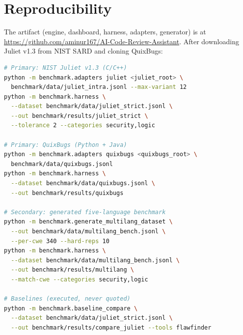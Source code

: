 \documentclass[10pt,conference]{IEEEtran}
\begin{document}
\section*{Reproducibility}
The artifact (engine, dashboard, harness, adapters, generator) is at
\url{https://github.com/aminur167/AI-Code-Review-Assistant}. After
downloading Juliet v1.3 from NIST SARD and cloning QuixBugs:
\begin{lstlisting}[language=bash,numbers=none]
# Primary: NIST Juliet v1.3 (C/C++)
python -m benchmark.adapters juliet <juliet_root> \
  benchmark/data/juliet_intra.jsonl --max-variant 12
python -m benchmark.harness \
  --dataset benchmark/data/juliet_strict.jsonl \
  --out benchmark/results/juliet_strict \
  --tolerance 2 --categories security,logic

# Primary: QuixBugs (Python + Java)
python -m benchmark.adapters quixbugs <quixbugs_root> \
  benchmark/data/quixbugs.jsonl
python -m benchmark.harness \
  --dataset benchmark/data/quixbugs.jsonl \
  --out benchmark/results/quixbugs

# Secondary: generated five-language benchmark
python -m benchmark.generate_multilang_dataset \
  --out benchmark/data/multilang_bench.jsonl \
  --per-cwe 340 --hard-reps 10
python -m benchmark.harness \
  --dataset benchmark/data/multilang_bench.jsonl \
  --out benchmark/results/multilang \
  --match-cwe --categories security,logic

# Baselines (executed, never quoted)
python -m benchmark.baseline_compare \
  --dataset benchmark/data/juliet_strict.jsonl \
  --out benchmark/results/compare_juliet --tools flawfinder
\end{lstlisting}
\end{document}

